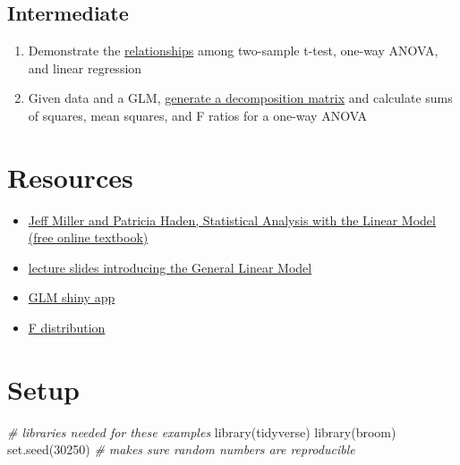 \documentclass[
  oneside]{book}
\newenvironment{Shaded}{\begin{snugshade}}{\end{snugshade}}
\newcommand{\CommentTok}[1]{\textcolor[rgb]{0.56,0.35,0.01}{\textit{#1}}}
\newcommand{\DecValTok}[1]{\textcolor[rgb]{0.00,0.00,0.81}{#1}}
\newcommand{\FunctionTok}[1]{\textcolor[rgb]{0.00,0.00,0.00}{#1}}
\newcommand{\NormalTok}[1]{#1}
\providecommand{\tightlist}{%
  \setlength{\itemsep}{0pt}\setlength{\parskip}{0pt}}
\begin{document}
\hypertarget{intermediate-3}{%
\subsection{Intermediate}\label{intermediate-3}}

\begin{enumerate}
\def\labelenumi{\arabic{enumi}.}
\setcounter{enumi}{6}
\tightlist
\item
  Demonstrate the \protect\hyperlink{test-rels}{relationships} among two-sample t-test, one-way ANOVA, and linear regression
\item
  Given data and a GLM, \protect\hyperlink{decomp}{generate a decomposition matrix} and calculate sums of squares, mean squares, and F ratios for a one-way ANOVA
\end{enumerate}

\hypertarget{resources9}{%
\section{Resources}\label{resources9}}

\begin{itemize}
\tightlist
\item
  \href{http://www.otago.ac.nz/psychology/otago039309.pdf}{Jeff Miller and Patricia Haden, Statistical Analysis with the Linear Model (free online textbook)}
\item
  \href{slides/08_glm_slides.pdf}{lecture slides introducing the General Linear Model}
\item
  \href{http://rstudio2.psy.gla.ac.uk/Dale/GLM}{GLM shiny app}
\item
  \href{http://rstudio2.psy.gla.ac.uk/Dale/fdist}{F distribution}
\end{itemize}

\hypertarget{setup9}{%
\section{Setup}\label{setup9}}

\begin{Shaded}
\begin{Highlighting}[]
\CommentTok{\# libraries needed for these examples}
\FunctionTok{library}\NormalTok{(tidyverse)}
\FunctionTok{library}\NormalTok{(broom)}
\FunctionTok{set.seed}\NormalTok{(}\DecValTok{30250}\NormalTok{) }\CommentTok{\# makes sure random numbers are reproducible}
\end{Highlighting}
\end{Shaded}
\end{document}
